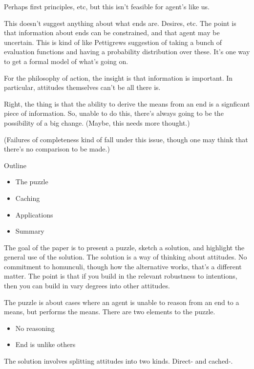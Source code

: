 \documentclass[10pt]{article}
\begin{document}
Perhaps first principles, etc, but this isn't feasible for agent's like us.

This doesn't suggest anything about what ends are.
Desires, etc.
The point is that information about ends can be constrained, and that agent may be uncertain.
This is kind of like Pettigrews suggestion of taking a bunch of evaluation functions and having a probability distribution over these.
It's one way to get a formal model of what's going on.

For the philosophy of action, the insight is that information is important.
In particular, attitudes themselves can't be all there is.

Right, the thing is that the ability to derive the means from an end is a signficant piece of information.
So, unable to do this, there's always going to be the possibility of a big change. (Maybe, this needs more thought.)

(Failures of completeness kind of fall under this issue, though one may think that there's no comparison to be made.)

\maketitle

Outline

\begin{itemize}
\item The puzzle
\item Caching
\item Applications
\item Summary
\end{itemize}

The goal of the paper is to present a puzzle, sketch a solution, and highlight the general use of the solution.
The solution is a way of thinking about attitudes.
No commitment to homunculi, though how the alternative works, that's a different matter.
The point is that if you build in the relevant robustness to intentions, then you can build in vary degrees into other attitudes.

The puzzle is about cases where an agent is unable to reason from an end to a means, but performs the means.
There are two elements to the puzzle.
\begin{itemize}
\item No reasoning
\item End is unlike others
\end{itemize}
The solution involves splitting attitudes into two kinds.
Direct- and cached-.
\end{document}
